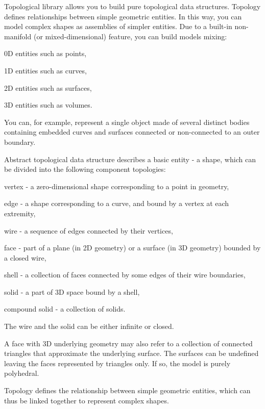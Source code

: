 Topological library allows you to build pure topological data structures. Topology defines relationships between simple geometric entities. In this way, you can model complex shapes as assemblies of simpler entities. Due to a built-\/in non-\/manifold (or mixed-\/dimensional) feature, you can build models mixing\+:
\begin{DoxyItemize}
\item 0D entities such as points,
\item 1D entities such as curves,
\item 2D entities such as surfaces,
\item 3D entities such as volumes.
\end{DoxyItemize}

You can, for example, represent a single object made of several distinct bodies containing embedded curves and surfaces connected or non-\/connected to an outer boundary.

Abstract topological data structure describes a basic entity -\/ a shape, which can be divided into the following component topologies\+:
\begin{DoxyItemize}
\item vertex -\/ a zero-\/dimensional shape corresponding to a point in geometry,
\item edge -\/ a shape corresponding to a curve, and bound by a vertex at each extremity,
\item wire -\/ a sequence of edges connected by their vertices,
\item face -\/ part of a plane (in 2D geometry) or a surface (in 3D geometry) bounded by a closed wire,
\item shell -\/ a collection of faces connected by some edges of their wire boundaries,
\item solid -\/ a part of 3D space bound by a shell,
\item compound solid -\/ a collection of solids.
\end{DoxyItemize}

The wire and the solid can be either infinite or closed.

A face with 3D underlying geometry may also refer to a collection of connected triangles that approximate the underlying surface. The surfaces can be undefined leaving the faces represented by triangles only. If so, the model is purely polyhedral.

Topology defines the relationship between simple geometric entities, which can thus be linked together to represent complex shapes.

